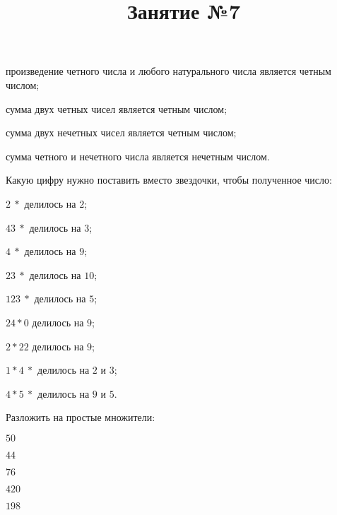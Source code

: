 \begin{class}[number=1]
\begin{listofex}
	\begin{enumcols}[itemcolumns=1]
		\item произведение четного числа и любого натурального числа является четным числом;
		\item сумма двух четных чисел является четным числом;
		\item сумма двух нечетных чисел является четным числом;
		\item сумма четного и нечетного числа является нечетным числом.
	\end{enumcols}
	\item Какую цифру нужно поставить вместо звездочки, чтобы полученное число:
	\begin{enumcols}[itemcolumns=3]
		\item \( 2\:* \) делилось на \( 2 \);
		\item \( 43\:* \) делилось на \( 3 \);
		\item \( 4\:* \) делилось на \( 9 \);
		\item \( 23\:* \) делилось на \( 10 \);
		\item \( 123\:* \) делилось на \( 5 \);
		\item \( 24*0 \) делилось на \( 9 \);
		\item \( 2*22 \) делилось на \( 9 \);
		\item \( 1*4\:* \) делилось на \( 2 \) и \( 3 \);
		\item \( 4*5\:* \) делилось на \( 9 \) и \( 5 \).
	\end{enumcols}
\end{listofex}
\title{Занятие №7}
\begin{listofex}
	\item Разложить на простые множители:
	\begin{enumcols}[itemcolumns=5]
		\item \( 50 \)
		\item \( 44 \)
		\item \( 76 \)
		\item \( 420 \)
		\item \( 198 \)

\end{enumcols}
\end{listofex}
\end{class}
